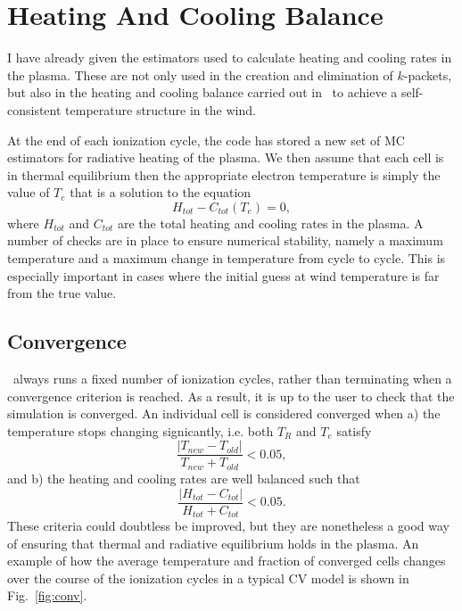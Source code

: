 \section{Heating And Cooling Balance}
\label{sec:heating_cooling}
I have already given the estimators used to calculate
heating and cooling rates in the plasma. These are not only used
in the creation and elimination of $k$-packets, but also in the heating
and cooling balance carried out in \py\ to achieve a self-consistent
temperature structure in the wind. 

At the end of each ionization cycle, the code has stored a new set
of MC estimators for radiative heating of the plasma. We then
assume that each cell is in thermal equilibrium then the appropriate
electron temperature is simply the value of $T_e$ that is a solution
to the equation
\begin{equation}
H_{tot} - C_{tot} ( T_e) = 0,
\end{equation}
where $H_{tot}$ and $C_{tot}$ are the total heating and cooling rates in 
the plasma. A number of checks are in place to ensure numerical stability,
namely a maximum temperature and a maximum change in temperature from cycle
to cycle. This is especially important in cases where the initial
guess at wind temperature is far from the true value.

\subsection{Convergence}

\py\ always runs a fixed number of ionization cycles, rather than terminating
when a convergence criterion is reached. As a result, it is up to the user
to check that the simulation is converged. An individual cell is considered
converged when a) the temperature stops changing signicantly, i.e. both
$T_R$ and $T_e$ satisfy
\begin{equation}
\frac{|T_{new} - T_{old}|}{T_{new} + T_{old}} < 0.05,
\end{equation}
and b) the heating and cooling rates are well balanced such that
\begin{equation}
\frac{|H_{tot} - C_{tot}|}{H_{tot} + C_{tot}} < 0.05.
\end{equation}
These criteria could doubtless be improved, but they are nonetheless
a good way of ensuring that thermal and radiative equilibrium holds in the 
plasma. An example of how the average temperature and fraction
of converged cells changes over the course of the ionization cycles in
a typical CV model is shown in Fig.~\ref{fig:conv}.


